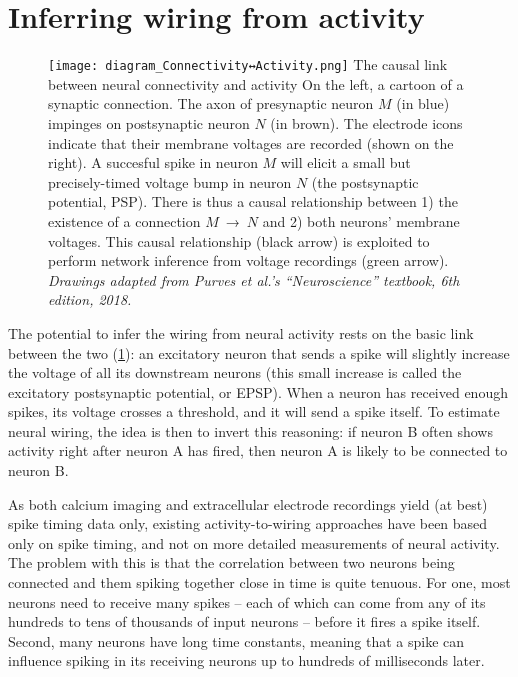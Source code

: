 \section{Inferring wiring from activity}

\begin{figure}
    \vspace*{2em}  %
    \hspace*{-2.5em}
    \texttt{[image: diagram\_Connectivity↔Activity.png]}
    \captionn
        {The causal link between neural connectivity and activity}
        {On the left, a cartoon of a synaptic connection. The axon of presynaptic neuron $M$ (in blue) impinges on postsynaptic neuron $N$ (in brown). The electrode icons indicate that their membrane voltages are recorded (shown on the right).
        A succesful spike in neuron $M$ will elicit a small but precisely-timed voltage bump in neuron $N$ (the postsynaptic potential, PSP).
        There is thus a causal relationship between 1) the existence of a connection $M$~→~$N$ and 2) both neurons' membrane voltages. This causal relationship (black arrow) is exploited to perform network inference from voltage recordings (green arrow).\newline
        \small{\emph{Drawings adapted from Purves et al.'s ``Neuroscience'' textbook, 6th edition, 2018.}}}
    \label{fig:diagram_Connectivity-Activity}
\end{figure}

The potential to infer the wiring from neural activity rests on the basic link between the two (\cref{fig:diagram_Connectivity-Activity}): an excitatory neuron that sends a spike will slightly increase the voltage of all its downstream neurons (this small increase is called the excitatory postsynaptic potential, or EPSP). When a neuron has received enough spikes, its voltage crosses a threshold, and it will send a spike itself. To estimate neural wiring, the idea is then to invert this reasoning: if neuron B often shows activity right after neuron A has fired, then neuron A is likely to be connected to neuron B.

As both calcium imaging and extracellular electrode recordings yield (at best) spike timing data only, existing activity-to-wiring approaches have been based only on spike timing\cite{MagransdeAbril2018ConnectivityInferenceNeural,Casadiego2018InferringNetworkConnectivity,Das2020SystematicErrorsConnectivity}, and not on more detailed measurements of neural activity. The problem with this is that the correlation between two neurons being connected and them spiking together close in time is quite tenuous. For one, most neurons need to receive many spikes – each of which can come from any of its hundreds to tens of thousands of input neurons – before it fires a spike itself. Second, many neurons have long time constants, meaning that a spike can influence spiking in its receiving neurons up to hundreds of milliseconds later.

